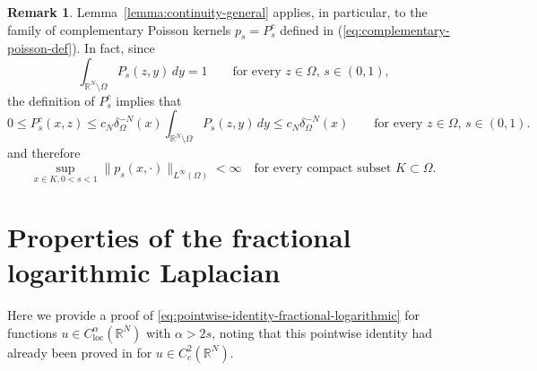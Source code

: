 \documentclass[notitlepage,11pt,reqno]{amsart}
\theoremstyle{definition}
\newtheorem{remark}[theorem]{Remark}
\numberwithin{equation}{section}
\newcommand{\loc}{\mathrm{loc}}
\newcommand{\R}{\mathds{R}}
\newcommand{\RR}{\mathds{R}}
\begin{document}
\begin{remark}
  \label{lemma:continuity-general-complement-Poisson}
  Lemma~\ref{lemma:continuity-general} applies, in particular, to the family of complementary Poisson kernels $p_s = P_s^c$ defined in (\ref{eq:complementary-poisson-def}). In fact, since
  $$
  \int_{\R^N \setminus \Omega}P_s(z,y)\,dy  = 1 \qquad \text{for every $z \in \Omega$, $s \in (0,1)$,}
  $$
the definition of $P_s^c$ implies that 
  $$
  0 \le P_s^c(x,z) \le c_N \delta_\Omega^{-N}(x)\int_{\R^N \setminus \Omega}P_s(z,y)\,dy \le c_N \delta_\Omega^{-N}(x)\qquad \text{for every $z \in \Omega$, $s \in (0,1)$.}
  $$
and therefore 
  \begin{equation}
    \label{lemma:continuity-general-add-0}
\sup_{x \in K, 0<s<1} \|p_s(x,\cdot)\|_{L^\infty(\Omega)}< \infty \quad \text{for every compact subset $K \subset \Omega$.}
\end{equation}
\end{remark}


\section{Properties of the fractional logarithmic Laplacian}\label{appD} Here we provide a proof of \eqref{eq:pointwise-identity-fractional-logarithmic} for functions $u \in C^{\alpha}_{\loc}(\R^N)$  with $\alpha>2s$, noting that this pointwise identity had already been proved in \cite[Proposition 1.1 and Theorem 1.1]{CH26} for $u\in C^2_c(\RR^N)$. 
\end{document}
